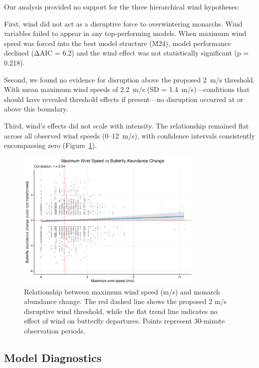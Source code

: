 Our analysis provided no support for the three hierarchical wind hypotheses:

First, wind did not act as a disruptive force to overwintering monarchs. Wind variables failed to appear in any top-performing models. When maximum wind speed was forced into the best model structure (M24), model performance declined (ΔAIC = 6.2) and the wind effect was not statistically significant (p = 0.218).

Second, we found no evidence for disruption above the proposed 2~m/s threshold. With mean maximum wind speeds of 2.2~m/s (SD = 1.4~m/s)—conditions that should have revealed threshold effects if present—no disruption occurred at or above this boundary.

Third, wind's effects did not scale with intensity. The relationship remained flat across all observed wind speeds (0–12~m/s), with confidence intervals consistently encompassing zero (Figure~\ref{fig:wind_scatter}).

\begin{figure}[htbp]
\centering
\includegraphics[width=0.8\textwidth]{supplemental/results/thesis_exports/figures/wind_hypothesis_scatter.png}
\caption{Relationship between maximum wind speed (m/s) and monarch abundance change. The red dashed line shows the proposed 2 m/s disruptive wind threshold, while the flat trend line indicates no effect of wind on butterfly departures. Points represent 30-minute observation periods.}\label{fig:wind_scatter}
\end{figure}

\subsection{Model Diagnostics}

